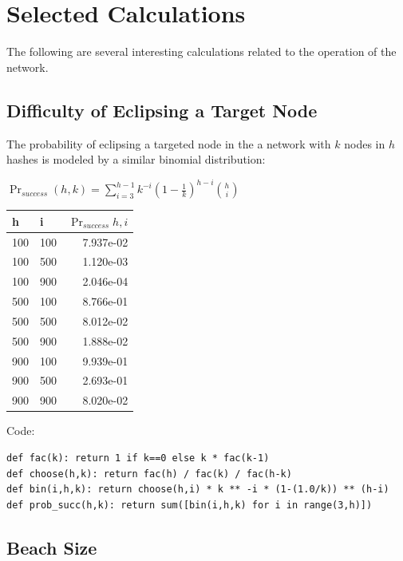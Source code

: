 \documentclass[a4paper,10pt]{article}
\begin{document}
\section{Selected Calculations}

The following are several interesting calculations related to the operation of
the network.

\subsection{Difficulty of Eclipsing a Target Node}

The probability of eclipsing a targeted node in the a network with $ k $ nodes
in $ h $ hashes is modeled by a similar binomial distribution:

{\centering
$\Pr_{success}(h, k) = \displaystyle \sum_{i=3}^{h-1}
k^{-i}(1-\frac{1}{k})^{h-i}{h \choose i}$
\\}

\begin{table}[hbt!]
\begin{center}
\begin{tabular}{l l r}
h & i & $\Pr_{success}{h,i}$\\
\hline  100 & 100 & 7.937e-02\\
\hline  100 & 500 & 1.120e-03\\
\hline  100 & 900 & 2.046e-04\\
\hline  500 & 100 & 8.766e-01\\
\hline  500 & 500 & 8.012e-02\\
\hline  500 & 900 & 1.888e-02\\
\hline  900 & 100 & 9.939e-01\\
\hline  900 & 500 & 2.693e-01\\
\hline  900 & 900 & 8.020e-02\\
\end{tabular}
\end{center}
\end{table}

Code:
\begin{lstlisting}
def fac(k): return 1 if k==0 else k * fac(k-1)
def choose(h,k): return fac(h) / fac(k) / fac(h-k)
def bin(i,h,k): return choose(h,i) * k ** -i * (1-(1.0/k)) ** (h-i)
def prob_succ(h,k): return sum([bin(i,h,k) for i in range(3,h)])
\end{lstlisting}

\subsection{Beach Size}
\end{document}
